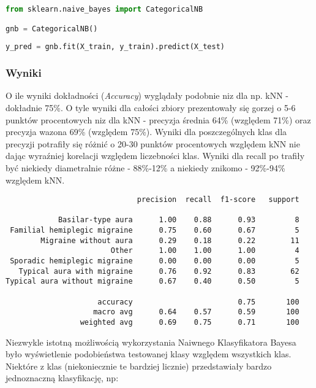 \begin{lstlisting}[language=Python, caption=Definicja i uzycie CategoricalNB]
from sklearn.naive_bayes import CategoricalNB

gnb = CategoricalNB()
    
y_pred = gnb.fit(X_train, y_train).predict(X_test)
\end{lstlisting}    

\subsubsection{Wyniki}
O ile wyniki dokładności (\textit{Accuracy}) wyglądały podobnie niz dla np. kNN - dokładnie 75\%. O tyle wyniki dla całości zbiory prezentowały się gorzej o 5-6 punktów procentowych niz dla kNN - precyzja średnia 64\% (względem 71\%) oraz precyzja wazona 69\% (względem 75\%). Wyniki dla poszczególnych klas dla precyzji potrafiły się różnić o 20-30 punktów procentowych względem kNN nie dając wyraźniej korelacji względem liczebności klas. Wyniki dla recall po trafiły być niekiedy diametralnie różne - 88\%-12\% a niekiedy znikomo - 92\%-94\% względem kNN.\\

\begin{verbatim}
                              precision  recall  f1-score   support

            Basilar-type aura      1.00    0.88      0.93         8
 Familial hemiplegic migraine      0.75    0.60      0.67         5
        Migraine without aura      0.29    0.18      0.22        11
                        Other      1.00    1.00      1.00         4
 Sporadic hemiplegic migraine      0.00    0.00      0.00         5
   Typical aura with migraine      0.76    0.92      0.83        62
Typical aura without migraine      0.67    0.40      0.50         5

                     accuracy                        0.75       100
                    macro avg      0.64    0.57      0.59       100
                 weighted avg      0.69    0.75      0.71       100
\end{verbatim}

Niezwykle istotną możliwością wykorzystania Naiwnego Klasyfikatora Bayesa było wyświetlenie podobieństwa testowanej klasy względem wszystkich klas.\\

Niektóre z klas (niekoniecznie te bardziej licznie) przedstawiały bardzo jednoznaczną klasyfikację, np:\\
\newpage

